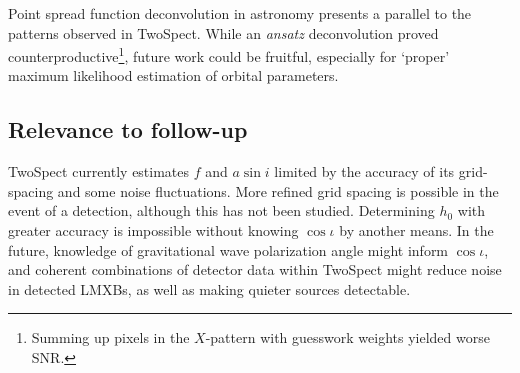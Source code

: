 Point spread function deconvolution in astronomy presents a parallel to the patterns observed in TwoSpect.
While an \textit{ansatz} deconvolution proved counterproductive\footnote{Summing up pixels in the $X$-pattern with guesswork weights yielded worse SNR.}, future work could be fruitful, especially for `proper' maximum likelihood estimation of orbital parameters.



\subsection{Relevance to follow-up}

TwoSpect currently estimates $f$ and $a \sin i$ limited by the accuracy of its grid-spacing and some noise fluctuations. 
More refined grid spacing is possible in the event of a detection, although this has not been studied. 
Determining $h_0$ with greater accuracy is impossible without knowing $\cos \iota$ by another means. 
In the future, knowledge of gravitational wave polarization angle might inform $\cos \iota$, and coherent combinations of detector data within TwoSpect might reduce noise in detected LMXBs, as well as making quieter sources detectable. 


